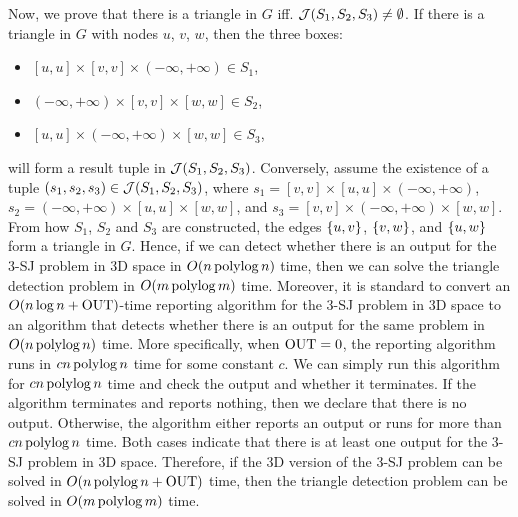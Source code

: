 Now, we prove that there is a triangle in $G$ iff.
 $\mathcal{J}(S_1,S_2,S_3) \neq \emptyset$. If there is a triangle in $G$ with nodes $u$, $v$, $w$, then the three boxes:
\begin{itemize}
    \item $[u,u]\times [v,v]\times(-\infty,+\infty)\in S_1$,
    \item $(-\infty,+\infty)\times[v,v]\times [w,w] \in S_2$,
    \item $[u,u]\times(-\infty,+\infty)\times [w,w] \in S_3$,
\end{itemize}
will form a result tuple in $\mathcal{J}(S_1,S_2,S_3)$. Conversely, assume the existence of a tuple $(s_1,s_2,s_3)\in \mathcal{J}(S_1,S_2,S_3)$, where $s_1 = [v,v]\times [u,u]\times(-\infty,+\infty)$, $s_2 = (-\infty,+\infty)\times[u,u]\times [w,w]$, and $s_3 = [v,v]\times(-\infty,+\infty)\times [w,w]$. From how $S_1$, $S_2$ and $S_3$ are constructed, the edges $\{u,v\}$, $\{v,w\}$, and $\{u,w\}$ form a triangle in $G$. Hence, if we can detect whether there is an output for the 3-SJ problem in 3D space in $O(n\operatorname*{polylog} n)$ time, then we can solve the triangle detection problem 
in $O(m \operatorname*{polylog} m)$ time. Moreover, it is standard to convert an $O(n \log n + \mathrm{OUT})$-time reporting algorithm for the 3-SJ problem in 3D space to an algorithm that detects whether there is an output for the same problem in $O(n \operatorname*{polylog} n)$ time. More specifically, when $\mathrm{OUT} = 0$, the reporting algorithm runs in $cn\operatorname*{polylog} n$ time for some constant $c$. We can simply run this algorithm for $cn\operatorname*{polylog} n$ time and check the output and whether it terminates. If the algorithm terminates and reports nothing, then we declare that there is no output. Otherwise, the algorithm either reports an output or runs for more than $cn\operatorname*{polylog} n$ time. Both cases indicate that there is at least one output for the 3-SJ problem in 3D space. Therefore, if the 3D version of the 3-SJ problem can be solved in $O(n\operatorname*{polylog} n + \mathrm{OUT})$ time, then the triangle detection problem can be solved in $O(m\operatorname*{polylog} m)$ time.